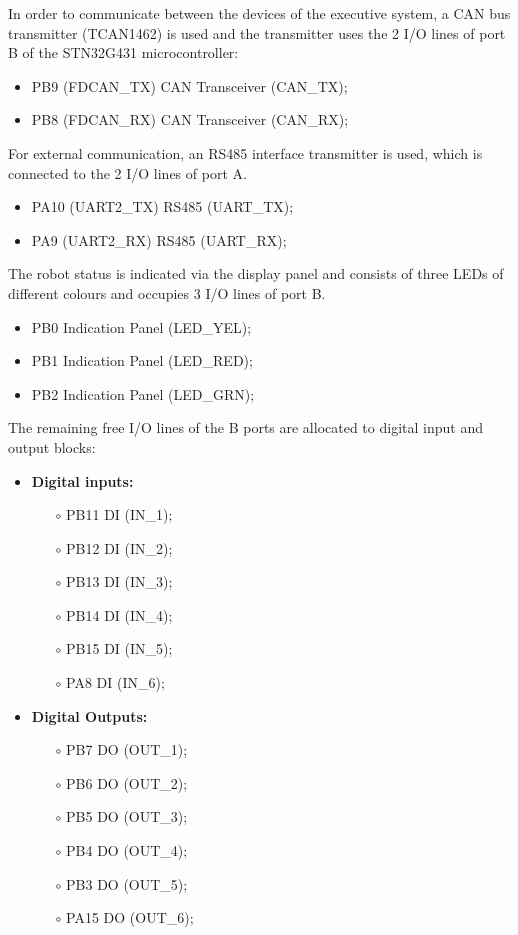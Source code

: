 In order to communicate between the devices of the executive system, a CAN bus transmitter (TCAN1462) is used and the transmitter uses the 2 I/O lines of port B of the STN32G431 microcontroller:
\begin{itemize}
	\item PB9 (FDCAN\_TX) \rightarrow CAN Transceiver (CAN\_TX);
	\item PB8 (FDCAN\_RX) \rightarrow CAN Transceiver (CAN\_RX);
\end{itemize}
For external communication, an RS485 interface transmitter is used, which is connected to the 2 I/O lines of port A.
\begin{itemize}
	\item PA10 (UART2\_TX) \rightarrow RS485 (UART\_TX);
	\item PA9 (UART2\_RX) \rightarrow RS485 (UART\_RX);
\end{itemize}
The robot status is indicated via the display panel and consists of three LEDs of different colours and occupies 3 I/O lines of port B.
\begin{itemize}
	\item PB0 \leftarrow Indication Panel (LED\_YEL);
	\item PB1 \leftarrow Indication Panel (LED\_RED);
	\item PB2 \leftarrow Indication Panel (LED\_GRN);
\end{itemize}
The remaining free I/O lines of the B ports are allocated to digital input and output blocks:
\begin{itemize}
	\item \textbf{Digital inputs:}
	      \begin{itemize}
		      \item[$\circ$] PB11 \leftarrow DI (IN\_1);
		      \item[$\circ$] PB12 \leftarrow DI (IN\_2);
		      \item[$\circ$] PB13 \leftarrow DI (IN\_3);
		      \item[$\circ$] PB14 \leftarrow DI (IN\_4);
		      \item[$\circ$] PB15 \leftarrow DI (IN\_5);
		      \item[$\circ$] PA8 \leftarrow DI (IN\_6);
	      \end{itemize}
	\item \textbf{Digital Outputs:}
	      \begin{itemize}
		      \item[$\circ$] PB7 \rightarrow DO (OUT\_1);
		      \item[$\circ$] PB6 \rightarrow DO (OUT\_2);
		      \item[$\circ$] PB5 \rightarrow DO (OUT\_3);
		      \item[$\circ$] PB4 \rightarrow DO (OUT\_4);
		      \item[$\circ$] PB3 \rightarrow DO (OUT\_5);
		      \item[$\circ$] PA15 \rightarrow DO (OUT\_6);
	      \end{itemize}
\end{itemize}

